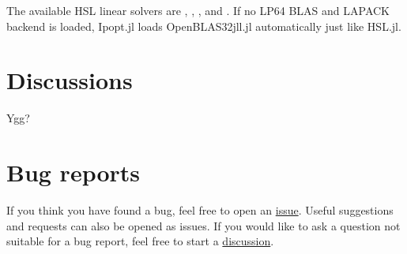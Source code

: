 \documentclass[gdweb]{geradwp}
\renewcommand{\_}{\raisebox{+0.35mm}{\textunderscore}}
\newcommand{\OpenBLASjll}{OpenBLAS32\_jll.jl\xspace}
\begin{document}
The available HSL linear solvers are , , ,  and .
If no LP64 BLAS and LAPACK backend is loaded, Ipopt.jl loads \OpenBLASjll automatically just like HSL.jl.

\section{Discussions}

Ygg?

\section{Bug reports}

If you think you have found a bug, feel free to open an \href{https://github.com/ralna/libHSL/issues}{issue}.
Useful suggestions and requests can also be opened as issues.
If you would like to ask a question not suitable for a bug report, feel free to start a \href{https://github.com/ralna/libHSL/discussions}{discussion}.



\end{document}
